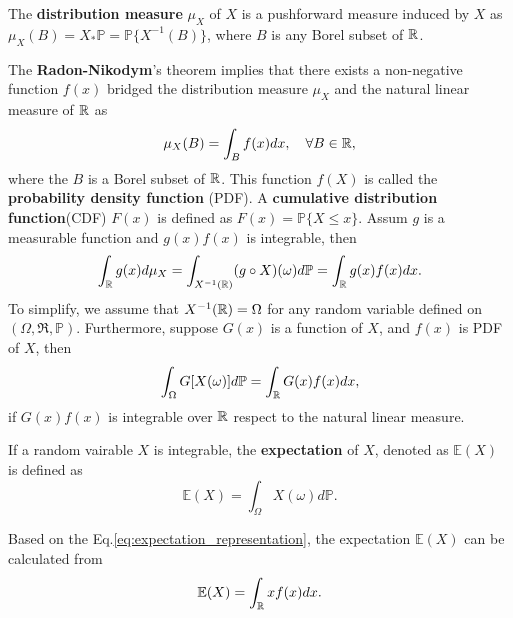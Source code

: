 \begin{definition}
The \textbf{distribution measure} $\mu_X$ of $X$ is a pushforward measure induced by $X$ as $\mu_X(B)=X_*\mathbb{P}=\mathbb{P}\{X^{-1}(B)\}$, where $B$ is any Borel subset of $\mathbb{R}$.
\end{definition}
The \textbf{Radon-Nikodym}'s theorem implies that there exists a non-negative function $f(x)$ bridged the distribution measure $\mu_X$ and the natural linear measure of $\mathbb{R}$ as
\begin{equation}
\mu_X(B) = \int_B f(x)d x, \quad\forall B\in\mathbb{R},
\end{equation} 
where the $B$ is a Borel subset of $\mathbb{R}$. This function $f(X)$ is called the \textbf{probability density function} (PDF). A \textbf{cumulative distribution function}(CDF) $F(x)$ is defined as $F(x)=\mathbb{P}\{X\le x\}$.
Assum $g$ is a measurable function and $g(x)f(x)$ is integrable, then
\begin{equation}
\int_{\mathbb{R}} g(x)d\mu_X=\int_{X^{-1}(\mathbb{R})}(g\circ X)(\omega)d\mathbb{P}=\int_{\mathbb{R}} g(x)f(x)dx.
\end{equation}
To simplify, we assume that $X^{-1}(\mathbb{R})=\Omega$ for any random variable defined on $(\Omega,\mathfrak{R},\mathbb{P})$. Furthermore, suppose $G(x)$ is a function of $X$, and $f(x)$ is PDF of $X$, then
\begin{equation}
\int_\Omega G[X(\omega)]d\mathbb{P} = \int_{\mathbb{R}} G(x)f(x)dx,
\label{eq:expectation_representation}
\end{equation}
if $G(x)f(x)$ is integrable over $\mathbb{R}$ respect to the natural linear measure.

\begin{definition}
If a random vairable $X$ is integrable, the \textbf{expectation} of $X$, denoted as $\mathbb{E}(X)$ is defined as
	\begin{equation}
	\mathbb{E}(X)=\int_{\Omega}X(\omega) d\mathbb{P}.
	\end{equation}
\end{definition}
Based on the Eq.\ref{eq:expectation_representation}, the expectation $\mathbb{E}(X)$ can be calculated from
\begin{equation*}
\mathbb{E}(X)=\int_{\mathbb{R}} xf(x)dx.
\end{equation*}

